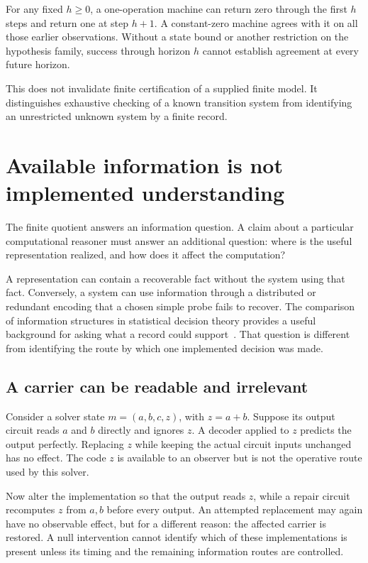 \begin{MUcounterexample}\label{MU:ex:horizon}
For any fixed $h\geq0$, a one-operation machine can return zero through the first $h$ steps and return one at step $h+1$. A constant-zero machine agrees with it on all those earlier observations. Without a state bound or another restriction on the hypothesis family, success through horizon $h$ cannot establish agreement at every future horizon.
\end{MUcounterexample}
This does not invalidate finite certification of a supplied finite model. It distinguishes exhaustive checking of a known transition system from identifying an unrestricted unknown system by a finite record.

\section{Available information is not implemented understanding}\label{MU:sec:use}
The finite quotient answers an information question. A claim about a particular computational reasoner must answer an additional question: where is the useful representation realized, and how does it affect the computation?

A representation can contain a recoverable fact without the system using that fact. Conversely, a system can use information through a distributed or redundant encoding that a chosen simple probe fails to recover. The comparison of information structures in statistical decision theory provides a useful background for asking what a record could support~\cite{MU:blackwell}. That question is different from identifying the route by which one implemented decision was made.

\subsection{A carrier can be readable and irrelevant}
Consider a solver state $m=(a,b,c,z)$, with $z=a+b$. Suppose its output circuit reads $a$ and $b$ directly and ignores $z$. A decoder applied to $z$ predicts the output perfectly. Replacing $z$ while keeping the actual circuit inputs unchanged has no effect. The code $z$ is available to an observer but is not the operative route used by this solver.

Now alter the implementation so that the output reads $z$, while a repair circuit recomputes $z$ from $a,b$ before every output. An attempted replacement may again have no observable effect, but for a different reason: the affected carrier is restored. A null intervention cannot identify which of these implementations is present unless its timing and the remaining information routes are controlled.

